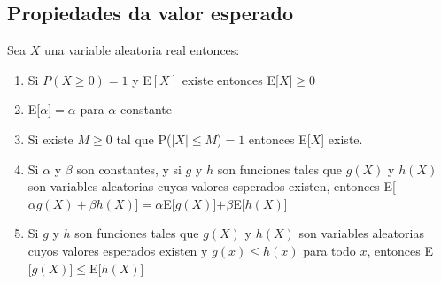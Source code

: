 \subsection{Propiedades da valor esperado}
\begin{Teo}
    Sea $X$ una variable aleatoria real entonces:
    \begin{enumerate}
        \item Si $P(X \geq 0) = 1$ y E$[X]$ existe entonces E[$X$]$\geq 0$
        \item E[$\alpha$]$= \alpha$ para $\alpha$ constante
        \item Si existe $M \geq 0$ tal que P($|X| \leq M$)$=1$ entonces E[$X$] existe. 
        \item Si $\alpha$ y $\beta$ son constantes, y si $g$ y $h$ son funciones tales que 
              $g(X)$ y $h(X)$ son variables aleatorias cuyos valores esperados existen, 
              entonces E[$\alpha g(X) + \beta h(X)$]$= \alpha$E[$g(X)$]$+ \beta$E[$h(X)$]
        \item Si $g$ y $h$ son funciones tales que $g(X)$ y $h(X)$ son variables aleatorias
              cuyos valores esperados existen y $g(x)\leq h(x)$ para todo $x$, entonces 
              E$[g(X)$]$\leq$E[$h(X)$]  
    \end{enumerate}
\end{Teo}
